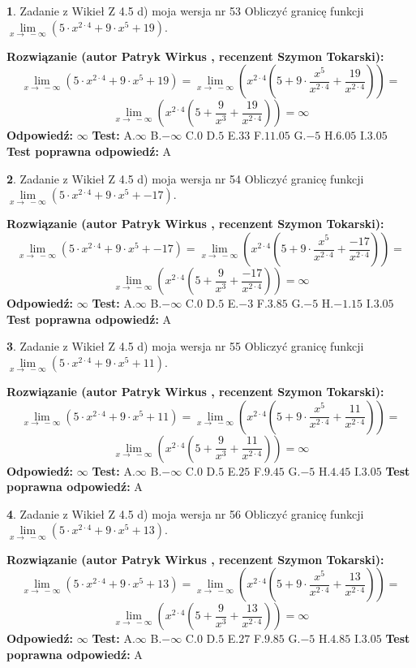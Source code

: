 \documentclass[12pt, a4paper]{article}
\theoremstyle{definition} %
\newtheorem{zad}{}
\newcommand{\zadStart}[1]{\begin{zad}#1\newline}
\newcommand{\zadStop}{\end{zad}}
\newcommand{\rozwStart}[2]{\noindent \textbf{Rozwiązanie (autor #1 , recenzent #2): }\newline}
\newcommand{\rozwStop}{\newline}
\newcommand{\odpStart}{\noindent \textbf{Odpowiedź:}\newline}
\newcommand{\odpStop}{\newline}
\newcommand{\testStart}{\noindent \textbf{Test:}\newline}
\newcommand{\testStop}{\newline}
\newcommand{\kluczStart}{\noindent \textbf{Test poprawna odpowiedź:}\newline}
\newcommand{\kluczStop}{\newline}
\begin{document}
\zadStart{Zadanie z Wikieł Z 4.5 d) moja wersja nr 53}
Obliczyć granicę funkcji  $\lim\limits_{x\to\ -\infty}(5 \cdot x^{2\cdot4}+9 \cdot x^{5}+19)$.
\zadStop
\rozwStart{Patryk Wirkus}{Szymon Tokarski}
$$\lim\limits_{x\to\ -\infty}(5 \cdot x^{2\cdot4}+9 \cdot x^{5}+19) = \lim\limits_{x\to\ -\infty}(x^{2\cdot4}(5 +9 \cdot \frac{x^{5}}{x^{2\cdot4}}+\frac{19}{x^{2\cdot4}})) =$$ $$\lim\limits_{x\to\ -\infty}(x^{2\cdot4}(5 +\frac{9}{x^{3}}+\frac{19}{x^{2\cdot4}})) =\infty$$
\rozwStop
\odpStart
$\infty$
\odpStop
\testStart
A.$\infty$ B.$-\infty$ C.$0$ D.$5$ E.$33$
F.$11.05$ G.$-5$
H.$6.05$
I.$3.05$
\testStop
\kluczStart
A
\kluczStop



\zadStart{Zadanie z Wikieł Z 4.5 d) moja wersja nr 54}
Obliczyć granicę funkcji  $\lim\limits_{x\to\ -\infty}(5 \cdot x^{2\cdot4}+9 \cdot x^{5}+-17)$.
\zadStop
\rozwStart{Patryk Wirkus}{Szymon Tokarski}
$$\lim\limits_{x\to\ -\infty}(5 \cdot x^{2\cdot4}+9 \cdot x^{5}+-17) = \lim\limits_{x\to\ -\infty}(x^{2\cdot4}(5 +9 \cdot \frac{x^{5}}{x^{2\cdot4}}+\frac{-17}{x^{2\cdot4}})) =$$ $$\lim\limits_{x\to\ -\infty}(x^{2\cdot4}(5 +\frac{9}{x^{3}}+\frac{-17}{x^{2\cdot4}})) =\infty$$
\rozwStop
\odpStart
$\infty$
\odpStop
\testStart
A.$\infty$ B.$-\infty$ C.$0$ D.$5$ E.$-3$
F.$3.85$ G.$-5$
H.$-1.15$
I.$3.05$
\testStop
\kluczStart
A
\kluczStop



\zadStart{Zadanie z Wikieł Z 4.5 d) moja wersja nr 55}
Obliczyć granicę funkcji  $\lim\limits_{x\to\ -\infty}(5 \cdot x^{2\cdot4}+9 \cdot x^{5}+11)$.
\zadStop
\rozwStart{Patryk Wirkus}{Szymon Tokarski}
$$\lim\limits_{x\to\ -\infty}(5 \cdot x^{2\cdot4}+9 \cdot x^{5}+11) = \lim\limits_{x\to\ -\infty}(x^{2\cdot4}(5 +9 \cdot \frac{x^{5}}{x^{2\cdot4}}+\frac{11}{x^{2\cdot4}})) =$$ $$\lim\limits_{x\to\ -\infty}(x^{2\cdot4}(5 +\frac{9}{x^{3}}+\frac{11}{x^{2\cdot4}})) =\infty$$
\rozwStop
\odpStart
$\infty$
\odpStop
\testStart
A.$\infty$ B.$-\infty$ C.$0$ D.$5$ E.$25$
F.$9.45$ G.$-5$
H.$4.45$
I.$3.05$
\testStop
\kluczStart
A
\kluczStop



\zadStart{Zadanie z Wikieł Z 4.5 d) moja wersja nr 56}
Obliczyć granicę funkcji  $\lim\limits_{x\to\ -\infty}(5 \cdot x^{2\cdot4}+9 \cdot x^{5}+13)$.
\zadStop
\rozwStart{Patryk Wirkus}{Szymon Tokarski}
$$\lim\limits_{x\to\ -\infty}(5 \cdot x^{2\cdot4}+9 \cdot x^{5}+13) = \lim\limits_{x\to\ -\infty}(x^{2\cdot4}(5 +9 \cdot \frac{x^{5}}{x^{2\cdot4}}+\frac{13}{x^{2\cdot4}})) =$$ $$\lim\limits_{x\to\ -\infty}(x^{2\cdot4}(5 +\frac{9}{x^{3}}+\frac{13}{x^{2\cdot4}})) =\infty$$
\rozwStop
\odpStart
$\infty$
\odpStop
\testStart
A.$\infty$ B.$-\infty$ C.$0$ D.$5$ E.$27$
F.$9.85$ G.$-5$
H.$4.85$
I.$3.05$
\testStop
\kluczStart
A
\kluczStop
\end{document}
